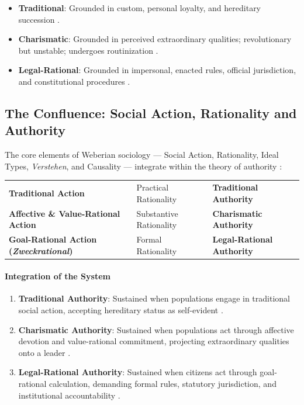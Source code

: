 \begin{QuickRevision}
\begin{itemize}
    \item \textbf{Traditional}: Grounded in custom, personal loyalty, and hereditary succession .
    \item \textbf{Charismatic}: Grounded in perceived extraordinary qualities; revolutionary but unstable; undergoes routinization .
    \item \textbf{Legal-Rational}: Grounded in impersonal, enacted rules, official jurisdiction, and constitutional procedures .
\end{itemize}
\end{QuickRevision}

\subsection{The Confluence: Social Action, Rationality and Authority}

The core elements of Weberian sociology --- Social Action, Rationality, Ideal Types, \textit{Verstehen}, and Causality --- integrate within the theory of authority :

\begin{table}[htbp]
\centering
\begin{tabularx}{\textwidth}{p{4.2cm} Y Y}
\hline
{}
 &  &  \\
\hline
\textbf{Traditional Action} & Practical Rationality  & \textbf{Traditional Authority}  \\
\textbf{Affective \& Value-Rational Action} & Substantive Rationality  & \textbf{Charismatic Authority}  \\
\textbf{Goal-Rational Action (\textit{Zweckrational})} & Formal Rationality  & \textbf{Legal-Rational Authority}  \\
\hline
\end{tabularx}
\end{table}

\paragraph{Integration of the System}
\begin{enumerate}
    \item \textbf{Traditional Authority}: Sustained when populations engage in traditional social action, accepting hereditary status as self-evident .
    \item \textbf{Charismatic Authority}: Sustained when populations act through affective devotion and value-rational commitment, projecting extraordinary qualities onto a leader .
    \item \textbf{Legal-Rational Authority}: Sustained when citizens act through goal-rational calculation, demanding formal rules, statutory jurisdiction, and institutional accountability .
\end{enumerate}

